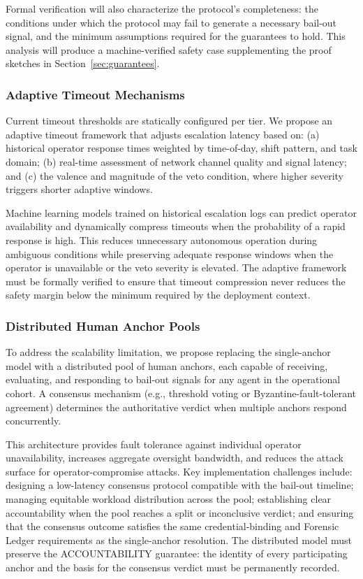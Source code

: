 Formal verification will also characterize the protocol's completeness: the
conditions under which the protocol may fail to generate a necessary bail-out
signal, and the minimum assumptions required for the guarantees to hold.  This
analysis will produce a machine-verified safety case supplementing the proof
sketches in Section~\ref{sec:guarantees}.

\subsubsection{Adaptive Timeout Mechanisms}

Current timeout thresholds are statically configured per tier.  We propose an
adaptive timeout framework that adjusts escalation latency based on: (a)
historical operator response times weighted by time-of-day, shift pattern, and
task domain; (b) real-time assessment of network channel quality and signal
latency; and (c) the valence and magnitude of the veto condition, where higher
severity triggers shorter adaptive windows.

Machine learning models trained on historical escalation logs can predict
operator availability and dynamically compress timeouts when the probability of a
rapid response is high.  This reduces unnecessary autonomous operation during
ambiguous conditions while preserving adequate response windows when the operator
is unavailable or the veto severity is elevated.  The adaptive framework must be
formally verified to ensure that timeout compression never reduces the safety
margin below the minimum required by the deployment context.

\subsubsection{Distributed Human Anchor Pools}

To address the scalability limitation, we propose replacing the single-anchor
model with a distributed pool of human anchors, each capable of receiving,
evaluating, and responding to bail-out signals for any agent in the operational
cohort.  A consensus mechanism (e.g., threshold voting or Byzantine-fault-tolerant
agreement) determines the authoritative verdict when multiple anchors respond
concurrently.

This architecture provides fault tolerance against individual operator
unavailability, increases aggregate oversight bandwidth, and reduces the attack
surface for operator-compromise attacks.  Key implementation challenges include:
designing a low-latency consensus protocol compatible with the bail-out timeline;
managing equitable workload distribution across the pool; establishing clear
accountability when the pool reaches a split or inconclusive verdict; and
ensuring that the consensus outcome satisfies the same credential-binding and
Forensic Ledger requirements as the single-anchor resolution.  The distributed model
must preserve the ACCOUNTABILITY guarantee: the identity of every participating
anchor and the basis for the consensus verdict must be permanently recorded.

